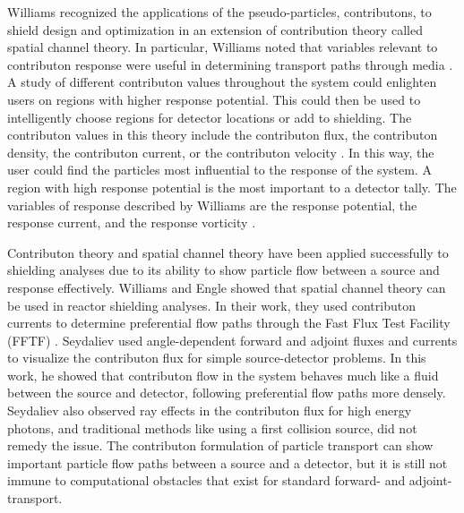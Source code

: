 Williams recognized the applications of the pseudo-particles, contributons, to
shield design and optimization in an extension of contribution theory called
spatial channel theory. In particular, Williams noted that variables
relevant to contributon response were useful in determining transport paths
through media \cite{williams_contributon_study, williams_SCC_shielding}. A study
of different contributon values throughout the system could enlighten users on
regions with higher response potential. This could then be used to intelligently
choose regions for detector locations or add to shielding.
The contributon values in this theory include the contributon flux, the
contributon density, the contributon current, or the contributon velocity
\cite{williams_relations_1977}.
In this way, the
user could find the particles most influential to the response of the system. A
region with high response potential is the most important to a detector tally. The
variables of response described by Williams are the response potential, the
response current, and the response vorticity \cite{williams_contributorn_1992}.

Contributon theory and spatial channel theory have been applied successfully to
shielding analyses \cite{seydaliev_contributon_2008, williams_SCC_shielding} due
to its ability to show particle flow between a source and response effectively.
Williams and Engle showed that
spatial channel theory can be used in reactor shielding analyses.
In their work, they used
contributon currents to determine preferential flow paths through the Fast Flux
Test Facility (FFTF) \cite{williams_SCC_shielding}.
Seydaliev \cite{seydaliev_contributon_2008} used angle-dependent forward and
adjoint
fluxes and currents to visualize the contributon flux for
simple source-detector problems. In this work, he showed that contributon flow
in the system behaves much like a fluid between the source and detector,
following preferential flow paths more densely.
Seydaliev also observed ray effects in the
contributon flux for high energy photons, and traditional methods like using a
first collision source, did not remedy the issue. The contributon formulation of
particle transport can show important particle flow paths between a source and a
detector, but it is still not immune to computational obstacles that exist for
standard forward- and adjoint- transport.

